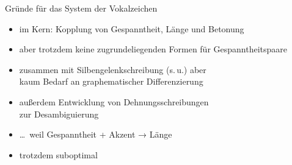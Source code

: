 



\begin{frame}
  {Gründe für das System der Vokalzeichen}
  \pause
  \begin{itemize}[<+->]
    \item im Kern: \alert{Kopplung von Gespanntheit, Länge und Betonung}
    \item aber trotzdem \alert{keine zugrundeliegenden Formen} für Gespanntheitspaare
    \item zusammen mit \alert{Silbengelenkschreibung} (s.\,u.) aber\\
      kaum Bedarf an graphematischer Differenzierung
      \Halbzeile
    \item außerdem Entwicklung von \alert{Dehnungsschreibungen}\\
      zur Desambiguierung
    \item \ldots\ weil \alert{Gespanntheit + Akzent → Länge}
      \Halbzeile
    \item trotzdem suboptimal
  \end{itemize}
\end{frame}


